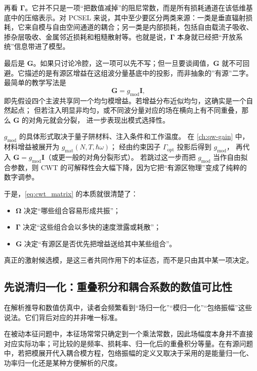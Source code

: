 再看 $\bm{\Gamma}$。它并不只是一项“把数值减掉”的阻尼常数，而是所有损耗通道在该低维基底中的压缩表示。对 PCSEL 来说，其中至少要区分两类来源：一类是垂直辐射损耗，它来自模与自由空间通道的耦合；另一类是内部损耗，包括自由载流子吸收、掺杂层吸收、金属邻近损耗和粗糙散射等。也就是说，$\bm{\Gamma}$ 本身就已经把“开放系统”信息带进了模型。

最后是 $\bm{G}$。如果只讨论冷腔，这一项可以先不写；但一旦要谈阈值，$\bm{G}$ 就不可回避。它描述的是有源区增益在这组波分量基底中的投影，而非抽象的”有源”二字。最简单的教学写法是
\[
\bm{G}=g_{\mathrm{mod}}\bm{I},
\]
即先假设四个主波共享同一个均匀模增益。若增益分布近似均匀，这确实是一个自然起点；
但若注入明显非均匀，或不同波分量对应的场在横向上有不同重叠，那么 $\bm{G}$ 的对角元就会分裂，
进一步表现出模式选择性。

\begin{RigorousBox}
$g_{\mathrm{mod}}$ 的具体形式取决于量子阱材料、注入条件和工作温度。
在 \cref{ch:qw-gain} 中，材料增益被展开为
$g_{\mathrm{mat}}(N,T,\hbar\omega)$；
经由约束因子 $\Gamma_{\mathrm{opt}}$ 投影后得到 $g_{\mathrm{mod}}$，
再代入 $\bm G=g_{\mathrm{mod}}\bm I$（或更一般的对角分裂形式）。
若跳过这一步而把 $g_{\mathrm{mod}}$ 当作自由拟合参数，则 CWT 的可解释性会大幅下降，因为它把“有源区物理”变成了纯粹的数字调参。
\end{RigorousBox}

于是，\cref{eq:cwt_matrix} 的本质就很清楚了：
\begin{itemize}
  \item $\bm{\Omega}$ 决定“哪些组合容易形成共振”；
  \item $\bm{\Gamma}$ 决定“这些组合会以多快的速度泄露或耗散”；
  \item $\bm{G}$ 决定“有源区是否优先把增益送给其中某些组合”。
\end{itemize}
真正的激射候选模，是这三者共同作用下的本征态，而不是只由其中某一项决定。

\subsection{先说清归一化：重叠积分和耦合系数的数值可比性}
在解析推导和数值仿真中，读者会频繁看到“场归一化”“模归一化”“包络振幅”这些说法。它们背后对应的并非唯一标准。

在被动本征问题中，本征场常常只确定到一个乘法常数，因此场幅度本身并不直接对应实际功率；可比较的是频率、损耗率、归一化后的重叠积分等量。在有源问题中，若把模展开代入耦合模方程，包络振幅的定义又取决于采用的是能量归一化、功率归一化还是某种方便解析的尺度。

